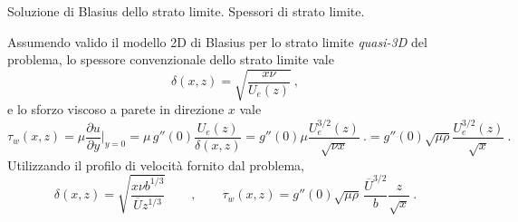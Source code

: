 
\sol

\partone Soluzione di Blasius dello strato limite. Spessori di strato limite.

\vspace{0.5cm}
\parttwo
 Assumendo valido il modello 2D di Blasius per lo strato limite \textit{quasi-3D} del problema, lo spessore convenzionale dello strato limite vale
 \begin{equation}
     \delta(x,z) = \sqrt{ \dfrac{x \nu}{ U_e(z)} } \ ,
 \end{equation}
 e lo sforzo viscoso a parete in direzione $x$ vale
 \begin{equation}
     \tau_w(x,z) = \mu \dfrac{\partial u}{\partial y}\Bigg|_{y=0} = 
     \mu \, g''(0) \dfrac{U_e(z)}{\delta(x,z)} = 
     g''(0) \mu \dfrac{U_e^{3/2}(z)}{\sqrt{\nu x}}  \ .
     = g''(0) \sqrt{ \mu \rho } \dfrac{U_e^{3/2}(z)}{\sqrt{x}}  \ .
 \end{equation}
 Utilizzando il profilo di velocità fornito dal problema,
 \begin{equation}
     \delta(x,z) = \sqrt{\dfrac{x \nu b^{1/3}}{ \overline{U} z^{1/3} }} \qquad , \qquad
     \tau_w(x,z) = g''(0) \sqrt{ \mu \rho } \, \dfrac{\overline{U}^{3/2}}{b} \dfrac{z}{\sqrt{x}}  \ .
 \end{equation}
 
